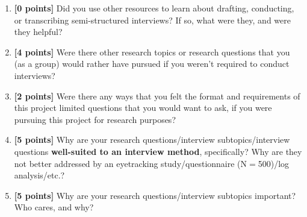 \documentclass{article}
\begin{document}
\begin{enumerate}
    \item \textbf{[0 points]} Did you use other resources to learn about drafting, conducting, or transcribing semi-structured interviews? If so, what were they, and were they helpful?
    
    \item \textbf{[4 points]} Were there other research topics or research questions that you (as a group)  would rather have pursued if you weren't required to conduct interviews?
    
    \item \textbf{[2 points]} Were there any ways that you felt the format and requirements of this project limited questions that you would want to ask, if you were pursuing this project for research purposes?
    
    \item \textbf{[5 points]} Why are your research questions/interview subtopics/interview questions \textbf{well-suited to an interview method}, specifically? Why are they not better addressed by an eyetracking study/questionnaire (N$=$500)/log analysis/etc.?
    
    \item \textbf{[5 points]} Why are your research questions/interview subtopics important? Who cares, and why?
\end{enumerate}
\end{document}
